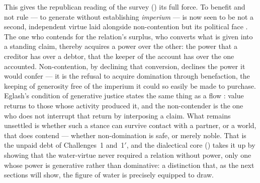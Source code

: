 This gives the republican reading of the survey () its full force. To benefit and not rule --- to generate without establishing \emph{imperium} --- is now seen to be not a second, independent virtue laid alongside non-contention but its political face \parencite{pettit1997}. The one who contends for the relation's surplus, who converts what is given into a standing claim, thereby acquires a power over the other: the power that a creditor has over a debtor, that the keeper of the account has over the one accounted. Non-contention, by declining that conversion, declines the power it would confer --- it is the refusal to acquire domination through benefaction, the keeping of generosity free of the imperium it could so easily be made to purchase. Eglash's condition of generative justice states the same thing as a flow \parencite{eglash2016}: value returns to those whose activity produced it, and the non-contender is the one who does not interrupt that return by interposing a claim. What remains unsettled is whether such a stance can survive contact with a partner, or a world, that does contend --- whether non-domination is safe, or merely noble. That is the unpaid debt of Challenges~1 and~1$'$, and the dialectical core () takes it up by showing that the water-virtue never required a relation without power, only one whose power is generative rather than dominative: a distinction that, as the next sections will show, the figure of water is precisely equipped to draw.
